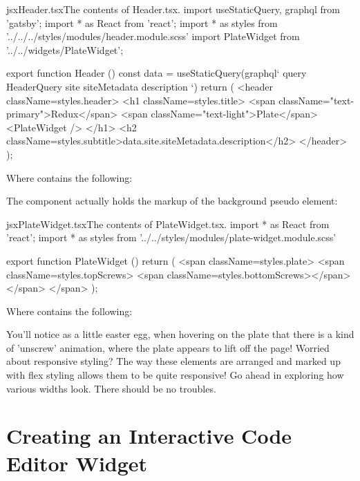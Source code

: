 \documentclass[paper=6in:9in,pagesize=pdftex,headinclude=on,footinclude=on,12pt,twoside]{scrbook}
\begin{document}
\begin{codeInput}{jsx}{Header.tsx}{The contents of Header.tsx.}
import { useStaticQuery, graphql } from 'gatsby';
import * as React from 'react';
import * as styles from '../../../styles/modules/header.module.scss'
import { PlateWidget } from '../../widgets/PlateWidget';

export function Header () {
  const data = useStaticQuery(graphql`
    query HeaderQuery {
      site {
        siteMetadata {
          description
        }
      }
    }
  `)
  return (
    <header className={styles.header}>
    <h1 className={styles.title}>
      <span className="text-primary">Redux</span>
      <span className="text-light">Plate</span>
      <PlateWidget />
    </h1>
    <h2 className={styles.subtitle}>{data.site.siteMetadata.description}</h2>
  </header>
  );
}  
\end{codeInput}

Where  contains the following:


The  component actually holds the markup of the background pseudo element:

\begin{codeInput}{jsx}{PlateWidget.tsx}{The contents of PlateWidget.tsx.}
import * as React from 'react';
import * as styles from '../../styles/modules/plate-widget.module.scss'

export function PlateWidget () {
  return (
    <span className={styles.plate}>
      <span className={styles.topScrews}>
        <span className={styles.bottomScrews}></span>
      </span>
    </span>
  );
}  
\end{codeInput}

Where  contains the following:


You'll notice as a little easter egg, when hovering on the plate that there is a kind of 'unscrew' animation, where the plate appears to lift off the page! Worried about responsive styling? The way these elements are arranged and marked up with flex styling allows them to be quite responsive! Go ahead in exploring how various widths look. There should be no troubles.

\section{Creating an Interactive Code Editor Widget}
\end{document}
